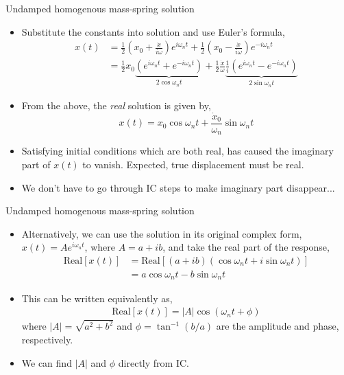 \documentclass[11pt,aspectratio=169,handout]{beamer}
\begin{document}
\begin{frame}[c]{Undamped homogenous mass-spring solution}
	\begin{itemize}
		\item<1-> Substitute the constants into solution and use Euler's formula, 
		\begin{align}
			x(t) &= \frac{1}{2}\left(x_0 +\frac{\dot{x}}{i\omega}\right) e^{i\omega_n t} + \frac{1}{2}\left(x_0 -\frac{\dot{x}}{i\omega}\right) e^{-i\omega_n t} \\
			&=  \frac{1}{2}x_0\underbrace{ \left(e^{i\omega_n t}  + e^{-i\omega_n t} \right) }_{2\cos\omega_n t}+\frac{1}{2}\frac{\dot{x}}{\omega}  \underbrace{\frac{1}{i}\left(e^{i\omega_n t} -e^{-i\omega_n t} \right)}_{2\sin\omega_n t}
		\end{align}
	\item<2-> From the above, the \textit{real} solution is given by,
	\begin{equation}
		x(t) = x_0 \cos\omega_n t + \frac{\dot{x}_0}{\omega_n} \sin\omega_n t
	\end{equation}
	\item<3-> Satisfying initial conditions which are both real, has caused the imaginary part of $x(t)$ to vanish. Expected, true displacement must be real.
	\item<4-> We don't have to go through IC steps to make imaginary part disappear... 
	\end{itemize}
\end{frame}

\begin{frame}[c]{Undamped homogenous mass-spring solution}
	\begin{itemize}
		\item<1-> Alternatively, we can use the solution in its original complex form, $	x(t) = Ae^{i\omega_n t}$, where $A=a+ib$, and take the real part of the response,
		\begin{align}
			\mbox{Real}[x(t)] &= \mbox{Real}[(a+ib)(\cos\omega_n t +i\sin\omega_n t)]\\
			 &=a \cos\omega_n t -b\sin\omega_n t
		\end{align}
	\item<2-> This can be written equivalently as, 
		\begin{align}
		\mbox{Real}[x(t)] = |A| \cos(\omega_nt+\phi)
	\end{align}
		where $|A| = \sqrt{a^2 + b^2}$ and $\phi = \tan^{-1}(b/a)$ are the amplitude and phase, respectively. 
		\item<2-> We can find $|A|$ and $\phi$ directly from IC.
\end{itemize}
\end{frame}
\end{document}
